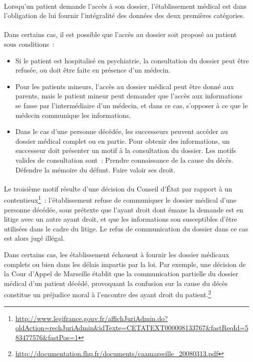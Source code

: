 \paragraph{}
Lorsqu'un patient demande l'accès à son dossier, l'établissement médical est dans l'obligation
de lui fournir l'intégralité des données des deux premières catégories.

\paragraph{}
Dans certains cas, il est possible que l'accès au dossier soit proposé au patient sous conditions~:

\begin{itemize}
    \item Si le patient est hospitalisé en psychiatrie, la consultation du
        dossier peut être refusée, ou doit être faite en présence d'un médecin.

    \item Pour les patients mineurs, l'accès au dossier médical peut être donné
        aux parents, mais le patient mineur peut demander que l'accès aux
        informations se fasse par l'intermédiaire d'un médecin, et dans ce cas,
        s'opposer à ce que le médecin communique les informations.

    \item Dans le cas d'une personne décédée, les successeurs peuvent accéder
        au dossier médical complet ou en partie. Pour obtenir des informations,
        un successeur doit présenter un motif à la consultation du dossier. Les
        motifs valides de consultation sont~:
            \subitem{\textbullet\,} Prendre connaissance de la cause du décès.
            \subitem{\textbullet\,} Défendre la mémoire du défunt.
            \subitem{\textbullet\,} Faire valoir ses droit.
\end{itemize}

\paragraph{}
Le troisième motif résulte d'une décision du Conseil d'État par rapport à un
contentieux\footnote{\url{http://www.legifrance.gouv.fr/affichJuriAdmin.do?oldAction=rechJuriAdmin&idTexte=CETATEXT000008133767&fastReqId=583477576&fastPos=1}}~:
l'établissement refuse de communiquer le dossier médical d'une personne
décédée, sous prétexte que l'ayant droit dont émane la demande est en litige
avec un autre ayant droit, et que les informations son susceptibles d'être
utilisées dans le cadre du litige.  Le refus de communication du dossier dans
ce cas est alors jugé illégal.

Dans certains cas, les établissement échouent à fournir les dossier médicaux
complets ou bien dans les délais impartis par la loi. Par exemple, une décision
de la Cour d'Appel de Marseille établit que la communication partielle du
dossier médical d'un patient décédé, provoquant la confusion sur la cause du
décès constitue un préjudice moral à l'encontre des ayant droit du
patient.\footnote{\url{http://documentation.fhp.fr/documents/caamarseille_20080313.pdf}}
